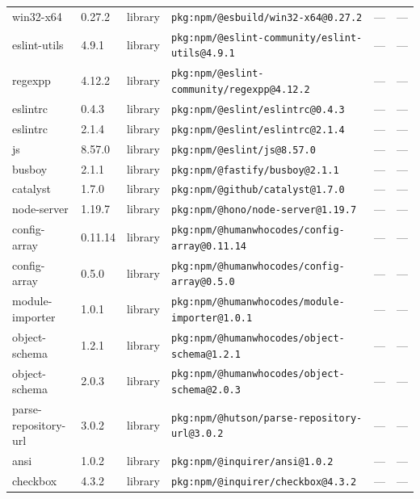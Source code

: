 \documentclass[11pt,a4paper]{article}
\begin{document}
\begin{longtable}{|p{4cm}|p{2cm}|p{1.6cm}|p{5cm}|p{1.5cm}|p{3.5cm}|}
\raggedright win32-x64 & 0.27.2 & library & \small\texttt{pkg:npm/@esbuild/win32-x64@0.27.2} & — & \small — \\
\raggedright eslint-utils & 4.9.1 & library & \small\texttt{pkg:npm/@eslint-community/eslint-utils@4.9.1} & — & \small — \\
\raggedright regexpp & 4.12.2 & library & \small\texttt{pkg:npm/@eslint-community/regexpp@4.12.2} & — & \small — \\
\raggedright eslintrc & 0.4.3 & library & \small\texttt{pkg:npm/@eslint/eslintrc@0.4.3} & — & \small — \\
\raggedright eslintrc & 2.1.4 & library & \small\texttt{pkg:npm/@eslint/eslintrc@2.1.4} & — & \small — \\
\raggedright js & 8.57.0 & library & \small\texttt{pkg:npm/@eslint/js@8.57.0} & — & \small — \\
\raggedright busboy & 2.1.1 & library & \small\texttt{pkg:npm/@fastify/busboy@2.1.1} & — & \small — \\
\raggedright catalyst & 1.7.0 & library & \small\texttt{pkg:npm/@github/catalyst@1.7.0} & — & \small — \\
\raggedright node-server & 1.19.7 & library & \small\texttt{pkg:npm/@hono/node-server@1.19.7} & — & \small — \\
\raggedright config-array & 0.11.14 & library & \small\texttt{pkg:npm/@humanwhocodes/config-array@0.11.14} & — & \small — \\
\raggedright config-array & 0.5.0 & library & \small\texttt{pkg:npm/@humanwhocodes/config-array@0.5.0} & — & \small — \\
\raggedright module-importer & 1.0.1 & library & \small\texttt{pkg:npm/@humanwhocodes/module-importer@1.0.1} & — & \small — \\
\raggedright object-schema & 1.2.1 & library & \small\texttt{pkg:npm/@humanwhocodes/object-schema@1.2.1} & — & \small — \\
\raggedright object-schema & 2.0.3 & library & \small\texttt{pkg:npm/@humanwhocodes/object-schema@2.0.3} & — & \small — \\
\raggedright parse-repository-url & 3.0.2 & library & \small\texttt{pkg:npm/@hutson/parse-repository-url@3.0.2} & — & \small — \\
\raggedright ansi & 1.0.2 & library & \small\texttt{pkg:npm/@inquirer/ansi@1.0.2} & — & \small — \\
\raggedright checkbox & 4.3.2 & library & \small\texttt{pkg:npm/@inquirer/checkbox@4.3.2} & — & \small — \\

\end{longtable}
\end{document}
